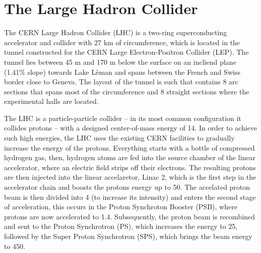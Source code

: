 \section{The Large Hadron Collider}
The CERN Large Hadron Collider (LHC) is a two-ring superconducting
accelerator and collider with 27 km of circumference, which is located
in the tunnel constructed for the CERN Large Electron-Positron
Collider (LEP). The tunnel lies between 45 m and 170 m below the
surface on an incliend plane (1.41\% slope) towards Lake L\`eman and
spans between the French and Swiss border close to Geneva. The layout
of the tunnel is such that contains 8 arc sections that spans most of
the circumference and 8 straight sections where the experimental halls
are located. 

The LHC is a particle-particle collider -- in its most common
configuration it collides protons -- with a designed center-of-mass
energy of 14\TeV. In order to achieve such high energies, the LHC uses
the existing CERN facilities to gradually increase the energy of the
protons. Everything starts with a bottle of compressed hydrogen gas,
then, hydrogen atoms are fed into the source chamber of the linear
accelerator, where an electric field strips off their
electrons. The resulting protons are then injected into the linear
accelaretor, Linac 2, which is the first step in the
accelerator chain and boosts the
protons energy up to 50\MeV. The accelated proton beam is then divided
into 4 (to increase its intensity) and enters the second stage of
acceleration, this occurs in the Proton Synchroton Booster (PSB),
where protons are now accelerated to 1.4\GeV. Subsequently, the proton beam is
recombined and sent to the Proton Synchrotron (PS), which increases
the energy to 25\GeV, followed by the Super Proton Synchrotron (SPS),
which brings the beam energy to 450\GeV.

